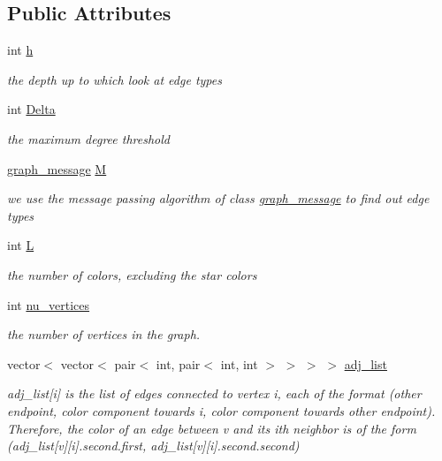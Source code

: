 \subsection*{Public Attributes}
\begin{DoxyCompactItemize}
\item 
int \hyperlink{classcolored__graph_ae27062a4ee59df2670d3a0c81e85a3fa}{h}
\begin{DoxyCompactList}\small\item\em the depth up to which look at edge types \end{DoxyCompactList}\item 
int \hyperlink{classcolored__graph_a5b0e93eb40a20dc815c809dee11edc12}{Delta}
\begin{DoxyCompactList}\small\item\em the maximum degree threshold \end{DoxyCompactList}\item 
\hyperlink{classgraph__message}{graph\+\_\+message} \hyperlink{classcolored__graph_ab72c568fe12f7c849ca6bffb145aec47}{M}
\begin{DoxyCompactList}\small\item\em we use the message passing algorithm of class \hyperlink{classgraph__message}{graph\+\_\+message} to find out edge types \end{DoxyCompactList}\item 
int \hyperlink{classcolored__graph_ae159d1b15106b70a2eabef8884501e97}{L}
\begin{DoxyCompactList}\small\item\em the number of colors, excluding the star colors \end{DoxyCompactList}\item 
int \hyperlink{classcolored__graph_a90ece8eb1fec52f3f41549ab527c1d5b}{nu\+\_\+vertices}
\begin{DoxyCompactList}\small\item\em the number of vertices in the graph. \end{DoxyCompactList}\item 
vector$<$ vector$<$ pair$<$ int, pair$<$ int, int $>$ $>$ $>$ $>$ \hyperlink{classcolored__graph_a45dce16965079286cf3f41a54a1b2ea4}{adj\+\_\+list}
\begin{DoxyCompactList}\small\item\em adj\+\_\+list\mbox{[}i\mbox{]} is the list of edges connected to vertex i, each of the format (other endpoint, color component towards i, color component towards other endpoint). Therefore, the color of an edge between v and its ith neighbor is of the form (adj\+\_\+list\mbox{[}v\mbox{]}\mbox{[}i\mbox{]}.second.\+first, adj\+\_\+list\mbox{[}v\mbox{]}\mbox{[}i\mbox{]}.second.\+second) \end{DoxyCompactList}\item 

\end{DoxyCompactItemize}
